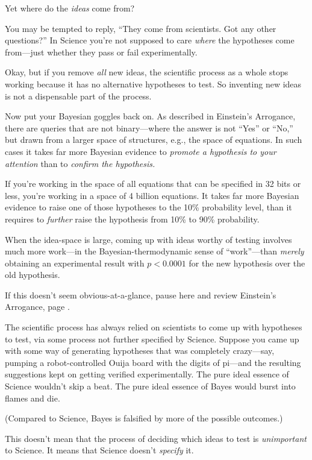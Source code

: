{
 Yet where do the \textit{ideas} come from?}

{
 You may be tempted to reply, ``They come from
scientists. Got any other questions?'' In Science
you're not supposed to care \textit{where} the
hypotheses come from---just whether they pass or fail experimentally.}

{
 Okay, but if you remove \textit{all} new ideas, the scientific
process as a whole stops working because it has no alternative
hypotheses to test. So inventing new ideas is not a dispensable part of
the process.}

{
 Now put your Bayesian goggles back on. As described in
Einstein's Arrogance, there are queries that are not
binary---where the answer is not
``Yes'' or
``No,'' but drawn from a larger
space of structures, e.g., the space of equations. In such cases it
takes far more Bayesian evidence to \textit{promote a hypothesis to
your attention} than to \textit{confirm the hypothesis.}}

{
 If you're working in the space of all equations
that can be specified in 32 bits or less, you're
working in a space of 4 billion equations. It takes far more Bayesian
evidence to raise one of those hypotheses to the 10\% probability
level, than it requires to \textit{further} raise the hypothesis from
10\% to 90\% probability.}

{
 When the idea-space is large, coming up with ideas worthy of
testing involves much more work---in the Bayesian-thermodynamic sense
of ``work''---than \textit{merely}
obtaining an experimental result with $p < 0.0001$ for the new
hypothesis over the old hypothesis.}

{
 If this doesn't seem obvious-at-a-glance, pause
here and review Einstein's Arrogance, page \pageref{einsteins_arrogance}.}

{
 The scientific process has always relied on scientists to come up
with hypotheses to test, via some process not further specified by
Science. Suppose you came up with some way of generating hypotheses
that was completely crazy---say, pumping a robot-controlled Ouija board
with the digits of pi---and the resulting suggestions kept on getting
verified experimentally. The pure ideal essence of Science
wouldn't skip a beat. The pure ideal essence of Bayes
would burst into flames and die.}

{
 (Compared to Science, Bayes is falsified by more of the possible
outcomes.)}

{
 This doesn't mean that the process of deciding
which ideas to test is \textit{unimportant} to Science. It means that
Science doesn't \textit{specify} it.}

